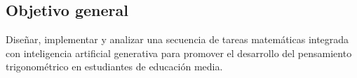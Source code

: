 \subsection{Objetivo general}

Diseñar, implementar y analizar una secuencia de tareas matemáticas integrada con inteligencia artificial generativa para promover el desarrollo del pensamiento trigonométrico en estudiantes de educación media.
